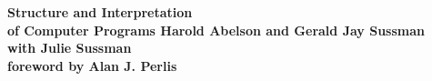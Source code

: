 
\startmakeup

\bf {\tfd Structure and Interpretation \\
 of Computer Programs}
\hairline
{}
\vfill
\tfa
Harold Abelson and Gerald Jay Sussman \\
with Julie Sussman \\
foreword by Alan J. Perlis

\stopmakeup

\startmakeup
{}
\midaligned{\currentdate[year, --, mm, --, dd]\ \currenttime}
\stopmakeup
